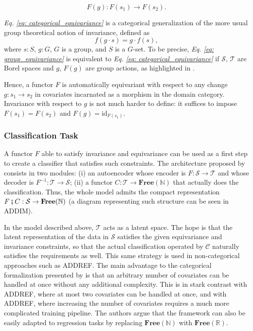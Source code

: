 \documentclass[11pt,a4paper,openright,twoside]{report}
\theoremstyle{plain}
\theoremstyle{definition}
\begin{document}
\begin{equation}
  \label{eq: categorical_equivariance}
  F(g): F(s_1) \to F(s_2).
\end{equation}

\textit{Eq. \ref{eq: categorical_equivariance}} is a categorical generalization of the more usual group theoretical notion of invariance, defined as
\begin{equation}
  \label{eq: group_equivariance}
  f(g \cdot s) = g \cdot f(s),
\end{equation}
where $s : S$, $g : G$, $G$ is a group, and $S$ is a $G$-set. To be precise, \textit{Eq. \ref{eq: group_equivariance}} is equivalent to \textit{Eq. \ref{eq: categorical_equivariance}} if $\mathcal{S}$, $\mathcal{T}$ are Borel spaces and $g$, $F(g)$ are group actions, as highlighted in \cite{chytas2024poolingimagedatasetsmultiple}.


Hence, a functor $F$ is automatically equivariant with respect to any change $g: s_1 \to s_2$ in covariates incarnated as a morphism in the domain category. Invariance with respect to $g$ is not much harder to define: it suffices to impose $F(s_1) = F(s_2)$ and $F(g) = \mathrm{id}_{F(s_1)}$.


\subsubsection{Classification Task}


A functor $F$ able to satisfy invariance and equivariance can be used as a first step to create a classifier that satisfies such constraints. The architecture proposed by \cite{chytas2024poolingimagedatasetsmultiple} consists in two modules: (i) an autoencoder whose encoder is $F: \mathcal{S} \to \mathcal{T}$ and whose decoder is $F^{-1}: \mathcal{T} \to \mathcal{S}$; (ii) a functor $C: \mathcal{T} \to \mathbf{Free}(\mathbb{N})$ that actually does the classification. Thus, the whole model admits the compact representation $F \fatsemi C: \mathcal{S} \to \mathbf{Free}(\mathbb{N})$ (a diagram representing such structure can be seen in ADDIM).


In the model described above, $\mathcal{T}$ acts as a latent space. The hope is that the latent representation of the data in $\mathcal{S}$ satisfies the given equivariance and invariance constraints, so that the actual classification operated by $\mathcal{C}$ naturally satisfies the requirements as well.
This same strategy is used in non-categorical approaches such as ADDREF. The main advantage to the categorical formalization presented by \cite{chytas2024poolingimagedatasetsmultiple} is that an arbitrary number of covariates can be handled at once without any additional complexity. This is in stark contrast with ADDREF, where at most two covariates can be handled at once, and with ADDREF, where increasing the number of covariates requires a much more complicated training pipeline. The authors argue that the framework can also be easily adapted to regression tasks by replacing $\mathbf{Free}(\mathbb{N})$ with $\mathbf{Free}(\mathbb{R})$.
\end{document}
